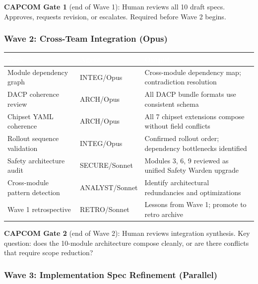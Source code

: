 \documentclass[11pt,letterpaper]{article}
\newcommand{\tableheader}[1]{\textbf{\sffamily\textcolor{white}{#1}}}
\begin{document}
\textbf{CAPCOM Gate 1} (end of Wave 1): Human reviews all 10 draft specs. Approves, requests revision, or escalates. Required before Wave 2 begins.

\subsubsection{Wave 2: Cross-Team Integration (Opus)}

\begin{center}
\begin{tabularx}{\textwidth}{L{4cm}L{2cm}X}
\toprule
{}
\tableheader{Task} & \tableheader{Agent} & \tableheader{Output} \\
\midrule
Module dependency graph & INTEG/Opus & Cross-module dependency map; contradiction resolution \\
DACP coherence review & ARCH/Opus & All DACP bundle formats use consistent schema \\
Chipset YAML coherence & ARCH/Opus & All 7 chipset extensions compose without field conflicts \\
Rollout sequence validation & INTEG/Opus & Confirmed rollout order; dependency bottlenecks identified \\
Safety architecture audit & SECURE/Sonnet & Modules 3, 6, 9 reviewed as unified Safety Warden upgrade \\
Cross-module pattern detection & ANALYST/Sonnet & Identify architectural redundancies and optimizations \\
Wave 1 retrospective & RETRO/Sonnet & Lessons from Wave 1; promote to retro archive \\
\end{tabularx}
\end{center}

\textbf{CAPCOM Gate 2} (end of Wave 2): Human reviews integration synthesis. Key question: does the 10-module architecture compose cleanly, or are there conflicts that require scope reduction?

\subsubsection{Wave 3: Implementation Spec Refinement (Parallel)}
\end{document}
